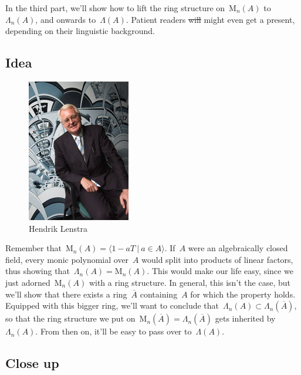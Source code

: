 In the third part, we'll show how to lift the ring structure on~$\mathrm{M}_{n}(A)$ to~$\Lambda_{n}(A)$, and onwards to~$\Lambda(A)$. Patient readers \sout{will} might even get a present, depending on their linguistic background.

\subsection{Idea}

\begin{figure}
  \centering
  \includegraphics[width=.3\textwidth]{playing-witt-rings/lenstra}
  \caption{Hendrik Lenstra}
\end{figure}

Remember that~$\mathrm{M}_{n}(A)=\langle {1-aT \ \vert \ a \in A} \rangle$. If~$A$ were an algebraically closed field, every monic polynomial over~$A$ would split into products of linear factors, thus showing that~$\Lambda_{n}(A)=\mathrm{M}_{n}(A)$. This would make our life easy, since we just adorned~$\mathrm{M}_{n}(A)$ with a ring structure. In general, this isn't the case, but we'll show that there exists a ring~$\overline{A}$ containing~$A$ for which the property holds. Equipped with this bigger ring, we'll want to conclude that~$\Lambda_{n}(A) \subset \Lambda_{n}(\overline{A})$, so that the ring structure we put on~$\mathrm{M}_{n}(\overline{A})=\Lambda_{n}(\overline{A})$ gets inherited by~$\Lambda_{n}(A)$. From then on, it'll be easy to pass over to~$\Lambda(A)$.

\subsection{Close up}

